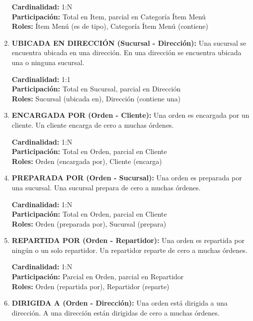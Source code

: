 \begin{enumerate}
    \textbf{Cardinalidad:} 1:N \\
    \textbf{Participación:} Total en Item, parcial en Categoría Ítem Menú \\
    \textbf{Roles:} Ítem Menú (es de tipo), Categoría Ítem Menú (contiene) \\

    \item \textbf{UBICADA EN DIRECCIÓN (Sucursal - Dirección):} Una sucursal se encuentra ubicada en una dirección. En una dirección se encuentra ubicada una o ninguna sucursal.

    \textbf{Cardinalidad:} 1:1 \\
    \textbf{Participación:} Total en Sucursal, parcial en Dirección \\
    \textbf{Roles:} Sucursal (ubicada en), Dirección (contiene una)

    \item \textbf{ENCARGADA POR (Orden - Cliente):} Una orden es encargada por un cliente. Un cliente encarga de cero a muchas órdenes.

    \textbf{Cardinalidad:} 1:N \\
    \textbf{Participación:} Total en Orden, parcial en Cliente \\
    \textbf{Roles:} Orden (encargada por), Cliente (encarga)

    \item \textbf{PREPARADA POR (Orden - Sucursal):} Una orden es preparada por una sucursal. Una sucursal prepara de cero a muchas órdenes.

    \textbf{Cardinalidad:} 1:N \\
    \textbf{Participación:} Total en Orden, parcial en Cliente \\
    \textbf{Roles:} Orden (preparada por), Sucursal (prepara)

    \item \textbf{REPARTIDA POR (Orden - Repartidor):} Una orden es repartida por ningún o un solo repartidor. Un repartidor reparte de cero a muchas órdenes.

    \textbf{Cardinalidad:} 1:N \\
    \textbf{Participación:} Parcial en Orden, parcial en Repartidor \\
    \textbf{Roles:} Orden (repartida por), Repartidor (reparte)

    \item \textbf{DIRIGIDA A (Orden - Dirección):} Una orden está dirigida a una dirección. A una dirección están dirigidas de cero a muchas órdenes.


\end{enumerate}
